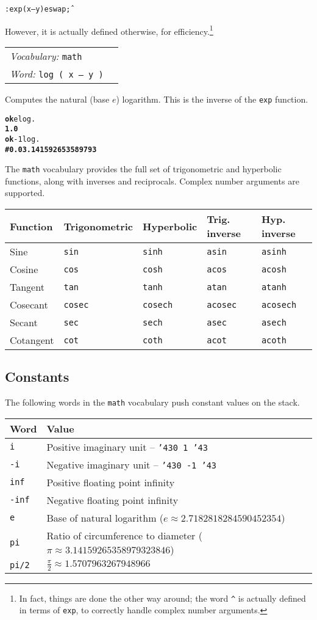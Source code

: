\documentclass{book}
\newcommand{\tto}{\symbol{123}}
\newcommand{\ttc}{\symbol{125}}
\newcommand{\pound}{\char'43}
\newcommand{\vocabulary}[1]{\emph{Vocabulary:} \texttt{#1}&\\}
\newcommand{\ordinaryword}[2]{\index{\texttt{#1}}\emph{Word:} \texttt{#2}&\\}
\newcommand{\wordtable}[1]{


\begin{tabularx}{12cm}{lX}
\hline
#1
\hline
\end{tabularx}

}
\begin{document}
\begin{alltt}
: exp ( x -- y ) e swap \^ ;
\end{alltt}

However, it is actually defined otherwise, for efficiency.\footnote{In fact, things are done the other way around; the word \texttt{\^{}} is actually defined in terms of \texttt{exp}, to correctly handle complex number arguments.}
\wordtable{
\vocabulary{math}
\ordinaryword{log}{log ( x -- y )}
}
Computes the natural (base $e$) logarithm. This is the inverse of the \texttt{exp} function.
\begin{alltt}
\textbf{ok} e log .
\textbf{1.0}
\textbf{ok} -1 log .
\textbf{\#\tto 0.0 3.141592653589793 \ttc}
\end{alltt}
The \texttt{math} vocabulary provides the full set of trigonometric and hyperbolic functions, along with inverses and reciprocals. Complex number arguments are supported.

\begin{tabular}{l|l|l|l|l}
Function&Trigonometric&Hyperbolic&Trig. inverse&Hyp. inverse\\
\hline
Sine&\texttt{sin}&\texttt{sinh}&\texttt{asin}&\texttt{asinh}\\
Cosine&\texttt{cos}&\texttt{cosh}&\texttt{acos}&\texttt{acosh}\\
Tangent&\texttt{tan}&\texttt{tanh}&\texttt{atan}&\texttt{atanh}\\
\hline
Cosecant&\texttt{cosec}&\texttt{cosech}&\texttt{acosec}&\texttt{acosech}\\
Secant&\texttt{sec}&\texttt{sech}&\texttt{asec}&\texttt{asech}\\
Cotangent&\texttt{cot}&\texttt{coth}&\texttt{acot}&\texttt{acoth}
\end{tabular}

\subsection{Constants}

The following words in the \texttt{math} vocabulary push constant values on the stack.

\begin{tabular}{l|l}
Word&Value\\
\hline
\texttt{i}&Positive imaginary unit -- \texttt{\pound\tto 0 1 \ttc\pound}\\
\texttt{-i}&Negative imaginary unit -- \texttt{\pound\tto 0 -1 \ttc\pound}\\
\texttt{inf}&Positive floating point infinity\\
\texttt{-inf}&Negative floating point infinity\\
\texttt{e}&Base of natural logarithm ($e\approx 2.7182818284590452354$)\\
\texttt{pi}&Ratio of circumference to diameter ($\pi\approx 3.14159265358979323846$)\\
\texttt{pi/2}&$\frac{\pi}{2}\approx 1.5707963267948966$
\end{tabular}
\end{document}
